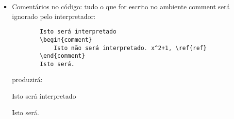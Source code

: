 \begin{itemize}
    \item Comentários no código: tudo o que for escrito no ambiente comment será ignorado pelo interpretador:
    
    \begin{verbatim}
        Isto será interpretado
        \begin{comment}
            Isto não será interpretado. x^2+1, \ref{ref}    
        \end{comment}
        Isto será.
    \end{verbatim}
        produzirá:
        
        Isto será interpretado
        \begin{comment}
            Isto não será interpretado, mesmo com erros x^2^2 ou comandos como \ref{ref}.    
        \end{comment}
        Isto será.
    
    
\end{itemize}
    
		